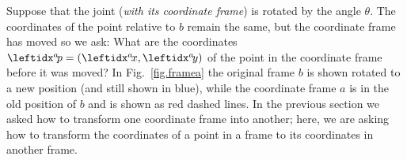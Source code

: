 
Suppose that the joint (\emph{with its coordinate frame}) is rotated by the angle $\theta$. The coordinates of the point relative to $b$ remain the same, but the coordinate frame has moved so we ask: What are the coordinates $\ap=(\ax,\ay)$ of the point in the coordinate frame before it was moved? In Fig.~\ref{fig.framea} the original frame $b$ is shown rotated to a new position (and still shown in blue), while the coordinate frame $a$ is in the old position of $b$ and is shown as red dashed lines. In the previous section we asked how to transform one coordinate frame into another; here, we are asking how to transform the coordinates of a point in a frame to its coordinates in another frame.

